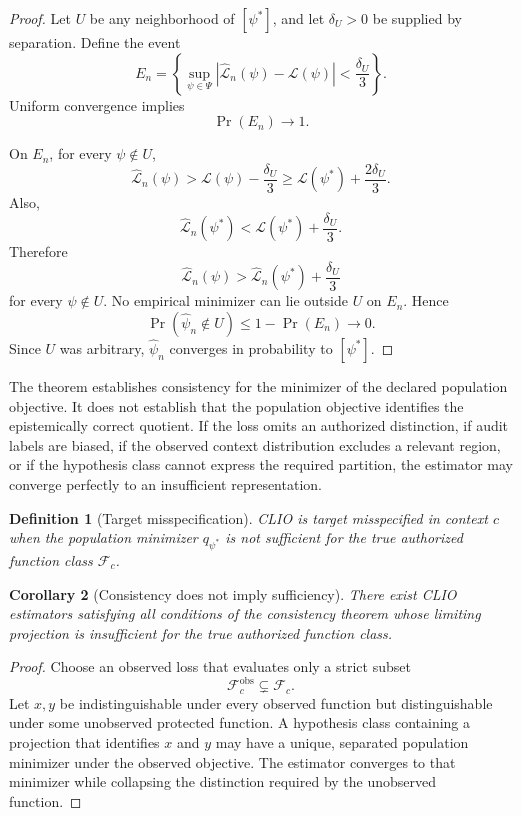 \documentclass[11pt]{article}
\newtheorem{definition}{Definition}[section]
\newtheorem{corollary}[definition]{Corollary}
\theoremstyle{definition}
\DeclareMathOperator{\Prob}{Pr}
\newcommand{\F}{\mathcal{F}}
\begin{document}
\begin{proof}
Let \(U\) be any neighborhood of \([\psi^{*}]\), and let \(\delta_U>0\) be supplied by separation. Define the event
\[
E_n
=
\left\{
\sup_{\psi\in\Psi}
\left|
\widehat{\mathcal L}_n(\psi)-\mathcal L(\psi)
\right|
<
\frac{\delta_U}{3}
\right\}.
\]
Uniform convergence implies
\[
\Prob(E_n)\to1.
\]

On \(E_n\), for every \(\psi\notin U\),
\[
\widehat{\mathcal L}_n(\psi)
>
\mathcal L(\psi)-\frac{\delta_U}{3}
\geq
\mathcal L(\psi^{*})
+
\frac{2\delta_U}{3}.
\]
Also,
\[
\widehat{\mathcal L}_n(\psi^{*})
<
\mathcal L(\psi^{*})
+
\frac{\delta_U}{3}.
\]
Therefore
\[
\widehat{\mathcal L}_n(\psi)
>
\widehat{\mathcal L}_n(\psi^{*})
+
\frac{\delta_U}{3}
\]
for every \(\psi\notin U\). No empirical minimizer can lie outside \(U\) on \(E_n\). Hence
\[
\Prob(\widehat\psi_n\notin U)
\leq
1-\Prob(E_n)
\to0.
\]
Since \(U\) was arbitrary, \(\widehat\psi_n\) converges in probability to \([\psi^{*}]\).
\end{proof}

The theorem establishes consistency for the minimizer of the declared population objective. It does not establish that the population objective identifies the epistemically correct quotient. If the loss omits an authorized distinction, if audit labels are biased, if the observed context distribution excludes a relevant region, or if the hypothesis class cannot express the required partition, the estimator may converge perfectly to an insufficient representation.

\begin{definition}[Target misspecification]
CLIO is target misspecified in context \(c\) when the population minimizer \(q_{\psi^{*}}\) is not sufficient for the true authorized function class \(\F_c\).
\end{definition}

\begin{corollary}[Consistency does not imply sufficiency]
There exist CLIO estimators satisfying all conditions of the consistency theorem whose limiting projection is insufficient for the true authorized function class.
\end{corollary}

\begin{proof}
Choose an observed loss that evaluates only a strict subset
\[
\F_c^{\mathrm{obs}}
\subsetneq
\F_c.
\]
Let \(x,y\) be indistinguishable under every observed function but distinguishable under some unobserved protected function. A hypothesis class containing a projection that identifies \(x\) and \(y\) may have a unique, separated population minimizer under the observed objective. The estimator converges to that minimizer while collapsing the distinction required by the unobserved function.
\end{proof}
\end{document}
